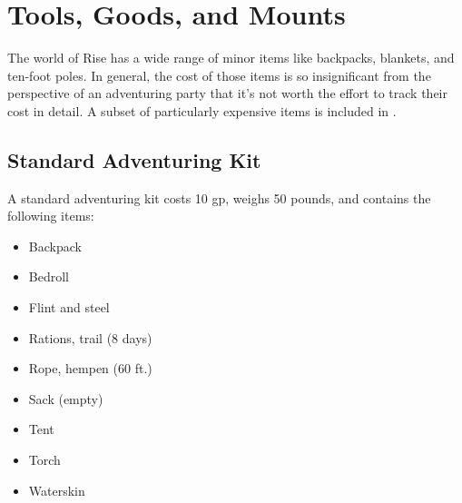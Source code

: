     

    

\newpage
\section{Tools, Goods, and Mounts}

    The world of Rise has a wide range of minor items like backpacks, blankets, and ten-foot poles.
    In general, the cost of those items is so insignificant from the perspective of an adventuring party that it's not worth the effort to track their cost in detail.
    A subset of particularly expensive items is included in .

    \subsection{Standard Adventuring Kit}
        A standard adventuring kit costs 10 gp, weighs 50 pounds, and contains the following items:
        \begin{itemize}
            \item Backpack
            \item Bedroll
            \item Flint and steel
            \item Rations, trail (8 days)
            \item Rope, hempen (60 ft.)
            \item Sack (empty)
            \item Tent
            \item Torch
            \item Waterskin
        \end{itemize}

    

    

